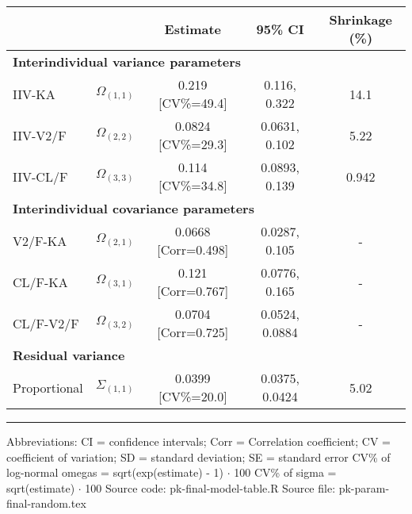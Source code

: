 \setlength{\tabcolsep}{5pt} 
\begin{threeparttable}
\renewcommand{\arraystretch}{1.3}
\begin{tabular}[h]{lcccc}
\hline
 &  & Estimate & 95\% CI & Shrinkage (\%) \\
\hline
\multicolumn{5}{l}{\textbf{Interindividual variance parameters}}\\%
IIV-KA & $\Omega_{(1,1)}$ & 0.219 [CV\%=49.4] & 0.116, 0.322 & 14.1 \\
IIV-V2/F & $\Omega_{(2,2)}$ & 0.0824 [CV\%=29.3] & 0.0631, 0.102 & 5.22 \\
IIV-CL/F & $\Omega_{(3,3)}$ & 0.114 [CV\%=34.8] & 0.0893, 0.139 & 0.942 \\
\hline \multicolumn{5}{l}{\textbf{Interindividual covariance parameters}}\\%
V2/F-KA & $\Omega_{(2,1)}$ & 0.0668 [Corr=0.498] & 0.0287, 0.105 & - \\
CL/F-KA & $\Omega_{(3,1)}$ & 0.121 [Corr=0.767] & 0.0776, 0.165 & - \\
CL/F-V2/F & $\Omega_{(3,2)}$ & 0.0704 [Corr=0.725] & 0.0524, 0.0884 & - \\
\hline \multicolumn{5}{l}{\textbf{Residual variance}}\\%
Proportional & $\Sigma_{(1,1)}$ & 0.0399 [CV\%=20.0] & 0.0375, 0.0424 & 5.02 \\
\hline
\end{tabular}
\end{threeparttable}
\vskip 0.67cm
\begin{minipage}{1\linewidth}
\linespread{1.1}\selectfont
\rule{1\linewidth}{0.4pt}
\vskip 0.02cm
Abbreviations: CI = confidence intervals; 
                        Corr = Correlation coefficient;
                        CV = coefficient of variation;
                        SD = standard deviation;
                        SE = standard error \newline
CV\% of log-normal omegas = sqrt(exp(estimate) - 1) $\cdot$ 100 \newline
CV\% of sigma = sqrt(estimate) $\cdot$ 100 \newline
Source code: pk-final-model-table.R \newline
Source file: pk-param-final-random.tex \newline
\end{minipage}
